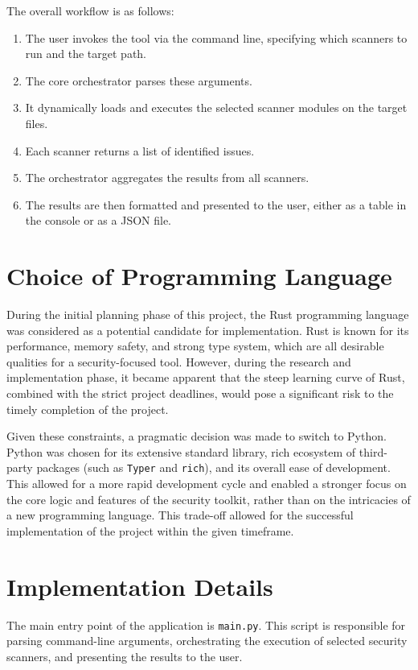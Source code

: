 The overall workflow is as follows:
\begin{enumerate}
    \item The user invokes the tool via the command line, specifying which scanners to run and the target path.
    \item The core orchestrator parses these arguments.
    \item It dynamically loads and executes the selected scanner modules on the target files.
    \item Each scanner returns a list of identified issues.
    \item The orchestrator aggregates the results from all scanners.
    \item The results are then formatted and presented to the user, either as a table in the console or as a JSON file.
\end{enumerate}

\section{Choice of Programming Language}

During the initial planning phase of this project, the Rust programming language was considered as a potential candidate for implementation. Rust is known for its performance, memory safety, and strong type system, which are all desirable qualities for a security-focused tool. However, during the research and implementation phase, it became apparent that the steep learning curve of Rust, combined with the strict project deadlines, would pose a significant risk to the timely completion of the project.

Given these constraints, a pragmatic decision was made to switch to Python. Python was chosen for its extensive standard library, rich ecosystem of third-party packages (such as \texttt{Typer} and \texttt{rich}), and its overall ease of development. This allowed for a more rapid development cycle and enabled a stronger focus on the core logic and features of the security toolkit, rather than on the intricacies of a new programming language. This trade-off allowed for the successful implementation of the project within the given timeframe.

\section{Implementation Details}

The main entry point of the application is \texttt{main.py}. This script is responsible for parsing command-line arguments, orchestrating the execution of selected security scanners, and presenting the results to the user.


